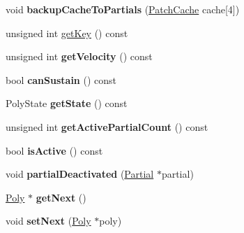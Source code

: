 \begin{DoxyCompactItemize}
\item 
\hypertarget{classMT32Emu_1_1Poly_adc439acb3fb8e91479f8c01e13c9953d}{void {\bfseries backup\-Cache\-To\-Partials} (\hyperlink{structMT32Emu_1_1PatchCache}{Patch\-Cache} cache\mbox{[}4\mbox{]})}\label{classMT32Emu_1_1Poly_adc439acb3fb8e91479f8c01e13c9953d}

\item 
unsigned int \hyperlink{classMT32Emu_1_1Poly_a6a79e77e725588976ee0b991011fb48a}{get\-Key} () const 
\item 
\hypertarget{classMT32Emu_1_1Poly_a2e3e5d52155b05a1f3f952b836da4dde}{unsigned int {\bfseries get\-Velocity} () const }\label{classMT32Emu_1_1Poly_a2e3e5d52155b05a1f3f952b836da4dde}

\item 
\hypertarget{classMT32Emu_1_1Poly_a75e3fad372218b249adba9a7ace0b21f}{bool {\bfseries can\-Sustain} () const }\label{classMT32Emu_1_1Poly_a75e3fad372218b249adba9a7ace0b21f}

\item 
\hypertarget{classMT32Emu_1_1Poly_a5c23313334953f2179b34161e2c2803f}{Poly\-State {\bfseries get\-State} () const }\label{classMT32Emu_1_1Poly_a5c23313334953f2179b34161e2c2803f}

\item 
\hypertarget{classMT32Emu_1_1Poly_a88b46902e05e80ec3deb45ae18e96a45}{unsigned int {\bfseries get\-Active\-Partial\-Count} () const }\label{classMT32Emu_1_1Poly_a88b46902e05e80ec3deb45ae18e96a45}

\item 
\hypertarget{classMT32Emu_1_1Poly_a4f3817b3cb69604ef43ce7b7170cbdec}{bool {\bfseries is\-Active} () const }\label{classMT32Emu_1_1Poly_a4f3817b3cb69604ef43ce7b7170cbdec}

\item 
\hypertarget{classMT32Emu_1_1Poly_a7db1ab26e8e34a2dd53e617fb7b711d9}{void {\bfseries partial\-Deactivated} (\hyperlink{classMT32Emu_1_1Partial}{Partial} $\ast$partial)}\label{classMT32Emu_1_1Poly_a7db1ab26e8e34a2dd53e617fb7b711d9}

\item 
\hypertarget{classMT32Emu_1_1Poly_a009d498367758effdf892a48e5f21ba7}{\hyperlink{classMT32Emu_1_1Poly}{Poly} $\ast$ {\bfseries get\-Next} ()}\label{classMT32Emu_1_1Poly_a009d498367758effdf892a48e5f21ba7}

\item 
\hypertarget{classMT32Emu_1_1Poly_a51c5bc70209de01f2d00e7ee3fe72dc3}{void {\bfseries set\-Next} (\hyperlink{classMT32Emu_1_1Poly}{Poly} $\ast$poly)}\label{classMT32Emu_1_1Poly_a51c5bc70209de01f2d00e7ee3fe72dc3}


\end{DoxyCompactItemize}
